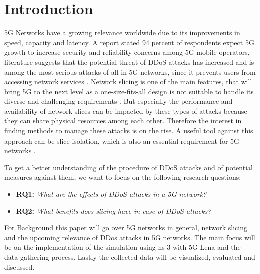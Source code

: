 

\chapter{Introduction}
\label{chapter:introduction}

5G Networks have a growing relevance worldwide due to its improvements in speed, capacity and latency. A report stated 94 percent of respondents expect 5G growth to increase security and reliability concerns among 5G mobile operators, literature suggests that the potential threat of DDoS attacks has increased and is among the most serious attacks of all in 5G networks, since it prevents users from accessing network services \cite{huang2021trend}. Network slicing is one of the main features, that will bring 5G to the next level as a one-size-fits-all design is not suitable to handle its diverse and challenging requirements \cite{zhang2019overview}. But especially the performance and availability of network slices can be impacted by these types of attacks because they can share physical resources among each other. Therefore the interest in finding methods to manage these attacks is on the rise. A useful tool against this approach can be slice isolation, which is also an essential requirement for 5G networks \cite{sattar2019towards}.

To get a better understanding of the procedure of DDoS attacks and of potential measures against them, we want to focus on the following research questions:
\begin{addmargin}[20pt]{0pt}
    \begin{itemize}
        \item \textbf{RQ1: }\textit{What are the effects of DDoS attacks in a 5G network?}
        \item \textbf{RQ2: }\textit{What benefits does slicing have in case of DDoS attacks?}
    \end{itemize}
\end{addmargin}

For Background this paper will go over 5G networks in general, network slicing and the upcoming relevance of DDos attacks in 5G networks. The main focus will be on the implementation of the simulation using ns-3 with 5G-Lena and the data gathering process. Lastly the collected data will be visualized, evaluated and discussed.